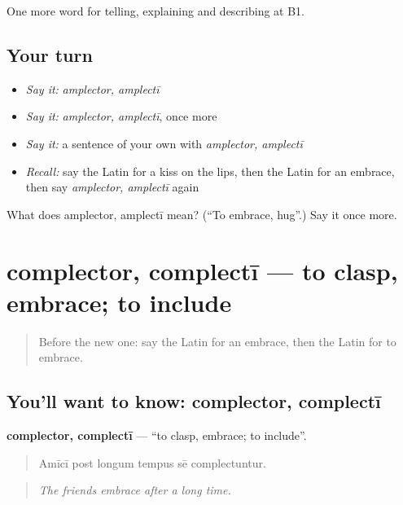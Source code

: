 \begin{grammarlens}[title={What you've built}]
One more word for telling, explaining and describing at B1.
\end{grammarlens}

\subsection*{Your turn}
\begin{itemize}
\raggedright
  \item \emph{Say it:} \emph{amplector, amplectī}
  \item \emph{Say it:} \emph{amplector, amplectī}, once more
  \item \emph{Say it:} a sentence of your own with \emph{amplector, amplectī}
  \item \emph{Recall:} say the Latin for a kiss on the lips, then the Latin for an embrace, then say \emph{amplector, amplectī} again
\end{itemize}

\begin{tcolorbox}[breakable,colback=teal!4,colframe=teal!35!black,title={Before you move on}]
What does amplector, amplectī mean? (\textquotedblleft{}To embrace, hug\textquotedblright{}.) Say it once more.
\end{tcolorbox}
\section[complector, complectī]{complector, complectī — to clasp, embrace; to include}

\label{lesson:LA-C535-complector}



\begin{quote}
Before the new one: say the Latin for an embrace, then the Latin for to embrace.
\end{quote}

\subsection*{You'll want to know: complector, complectī}
\textbf{complector, complectī} — \textquotedblleft{}to clasp, embrace; to include\textquotedblright{}.

\begin{quote}
Amīcī post longum tempus sē complectuntur.
\end{quote}

\begin{quote}
\emph{The friends embrace after a long time.}
\end{quote}

